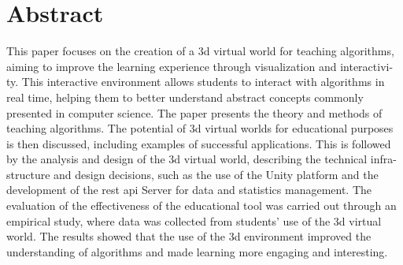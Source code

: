 {}
\section*{Abstract}

This paper focuses on the creation of a \acrshort{3d} virtual world for teaching algorithms, aiming to improve the learning experience through visualization and interactivi-ty. This interactive environment allows students to interact with algorithms in real time, helping them to better understand abstract concepts commonly presented in computer science. The paper presents the theory and methods of teaching algorithms. The potential of \acrshort{3d} virtual worlds for educational purposes is then discussed, including examples of successful applications. This is followed by the analysis and design of the \acrshort{3d} virtual world, describing the technical infra-structure and design decisions, such as the use of the Unity platform and the development of the \acrshort{rest} \acrshort{api} Server for data and statistics management. The evaluation of the effectiveness of the educational tool was carried out through an empirical study, where data was collected from students' use of the \acrshort{3d} virtual world. The results showed that the use of the \acrshort{3d} environment improved the understanding of algorithms and made learning more engaging and interesting.

\pagebreak
